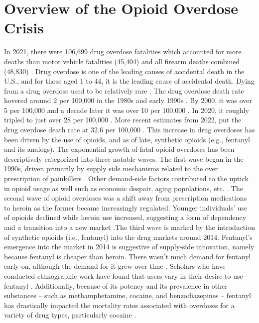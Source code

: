 \section{Overview of the Opioid Overdose Crisis}
In 2021, there were 106,699 drug overdose fatalities which accounted for more deaths than motor vehicle fatalities (45,404) and all firearm deaths combined (48,830) \parencite{center_for_disease_control_and_prevention_injuries_2023}. Drug overdose is one of the leading causes of accidental death in the U.S., and for those aged 1 to 44, it is the leading cause of accidental death. Dying from a drug overdose used to be relatively rare \parencite{center_for_disease_control_and_prevention_national_2023}. The drug overdose death rate hovered around 2 per 100,000 in the 1980s and early 1990s \parencite{warner_drug_2011}. By 2000, it was over 5 per 100,000 and a decade later it was over 10 per 100,000 \parencite{rudd_increases_2016}. In 2020, it roughly tripled to just over 28 per 100,000 \parencite{hedegaard_drug_2021}. More recent estimates from 2022, put the drug overdose death rate at 32.6 per 100,000 \parencite{spencer_drug_2024}. This increase in drug overdoses has been driven by the use of opioids, and as of late, synthetic opioids (e.g., fentanyl and its analogs). The exponential growth of fatal opioid overdoses has been descriptively categorized into three notable waves. The first wave began in the 1990s, driven primarily by supply side mechanisms related to the over prescription of painkillers \parencite{kolodny_prescription_2015}. Other demand-side factors contributed to the uptick in opioid usage as well such as economic despair, aging populations, etc. \parencite{dasgupta_opioid_2018}. The second wave of opioid overdoses was a shift away from prescription medications to heroin as the former became increasingly regulated. Younger individuals’ use of opioids declined while heroin use increased, suggesting a form of dependency and a transition into a new market \parencite{unick_us_2017}.The third wave is marked by the introduction of synthetic opioids (i.e., fentanyl) into the drug markets around 2014. Fentanyl’s emergence into the market in 2014 is suggestive of supply-side innovation, namely because fentanyl is cheaper than heroin. There wasn't much demand for fentanyl early on, although the demand for it grew over time \parencite{powell_evolving_2021}. Scholars who have conducted ethnographic work have found that users vary in their desire to use fentanyl \parencite{carroll_exposure_2017, mars_illicit_2019}. Additionally, because of its potency \parencite{ciccarone_fentanyl_2017} and its prevalence in other substances – such as methamphetamine, cocaine, and benzodiazepines – fentanyl has drastically impacted the mortality rates associated with overdoses for a variety of drug types, particularly cocaine \parencite{humphreys_responding_2022}.

